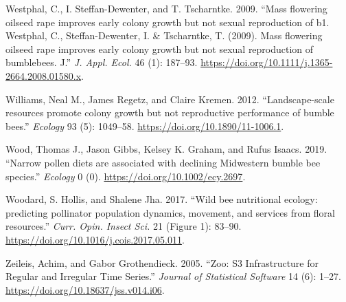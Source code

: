 \documentclass[11pt,]{article}
\begin{document}
\leavevmode\hypertarget{ref-Westphal2009a}{}%
Westphal, C., I. Steffan-Dewenter, and T. Tscharntke. 2009. ``Mass
flowering oilseed rape improves early colony growth but not sexual
reproduction of b1. Westphal, C., Steffan-Dewenter, I. \& Tscharntke, T.
(2009). Mass flowering oilseed rape improves early colony growth but not
sexual reproduction of bumblebees. J.'' \emph{J. Appl. Ecol.} 46 (1):
187--93. \url{https://doi.org/10.1111/j.1365-2664.2008.01580.x}.

\leavevmode\hypertarget{ref-Williams2012b}{}%
Williams, Neal M., James Regetz, and Claire Kremen. 2012.
``Landscape-scale resources promote colony growth but not reproductive
performance of bumble bees.'' \emph{Ecology} 93 (5): 1049--58.
\url{https://doi.org/10.1890/11-1006.1}.

\leavevmode\hypertarget{ref-Wood2019}{}%
Wood, Thomas J., Jason Gibbs, Kelsey K. Graham, and Rufus Isaacs. 2019.
``Narrow pollen diets are associated with declining Midwestern bumble
bee species.'' \emph{Ecology} 0 (0).
\url{https://doi.org/10.1002/ecy.2697}.

\leavevmode\hypertarget{ref-Woodard2017}{}%
Woodard, S. Hollis, and Shalene Jha. 2017. ``Wild bee nutritional
ecology: predicting pollinator population dynamics, movement, and
services from floral resources.'' \emph{Curr. Opin. Insect Sci.} 21
(Figure 1): 83--90. \url{https://doi.org/10.1016/j.cois.2017.05.011}.

\leavevmode\hypertarget{ref-zoo}{}%
Zeileis, Achim, and Gabor Grothendieck. 2005. ``Zoo: S3 Infrastructure
for Regular and Irregular Time Series.'' \emph{Journal of Statistical
Software} 14 (6): 1--27. \url{https://doi.org/10.18637/jss.v014.i06}.
\end{document}
